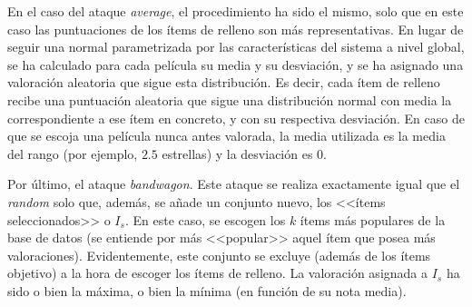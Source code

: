 En el caso del ataque \textit{average}, el procedimiento ha sido el mismo, solo que en este caso las puntuaciones de los ítems de relleno son más representativas. En lugar de seguir una normal parametrizada por las características del sistema a nivel global, se ha calculado para cada película su media y su desviación, y se ha asignado una valoración aleatoria que sigue esta distribución. Es decir, cada ítem de relleno recibe una puntuación aleatoria que sigue una distribución normal con media la correspondiente a ese ítem en concreto, y con su respectiva desviación. En caso de que se escoja una película nunca antes valorada, la media utilizada es la media del rango (por ejemplo, $2.5$ estrellas) y la desviación es $0$.

Por último, el ataque \textit{bandwagon}. Este ataque se realiza exactamente igual que el \textit{random} solo que, además, se añade un conjunto nuevo, los <<ítems seleccionados>> o $I_s$. En este caso, se escogen los $k$ ítems más populares de la base de datos (se entiende por más <<popular>> aquel ítem que posea más valoraciones). Evidentemente, este conjunto se excluye (además de los ítems objetivo) a la hora de escoger los ítems de relleno. La valoración asignada a $I_s$ ha sido o bien la máxima, o bien la mínima (en función de su nota media).














